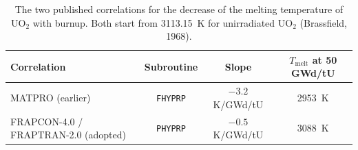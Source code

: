\begin{table}[htbp]
\centering
\caption[UO2 melting correlations]{The two published correlations for the
decrease of the melting temperature of $\mathrm{UO_2}$ with burnup. Both start
from \SI{3113.15}{\kelvin} for unirradiated $\mathrm{UO_2}$ (Brassfield, 1968).}
\label{tab:fusion}
\small
\begin{tabularx}{\textwidth}{@{}Xccc@{}}
\toprule
\textbf{Correlation} & \textbf{Subroutine} & \textbf{Slope} &
\textbf{$T_{\text{melt}}$ at 50 GWd/tU}\\
\midrule
MATPRO (earlier) & \texttt{FHYPRP} & $-3.2$ K/GWd/tU
  & \SI{2953}{\kelvin}\\
FRAPCON-4.0 / FRAPTRAN-2.0 (adopted) & \texttt{PHYPRP} &
  $-0.5$ K/GWd/tU & \SI{3088}{\kelvin}\\
\bottomrule
\end{tabularx}
\end{table}
